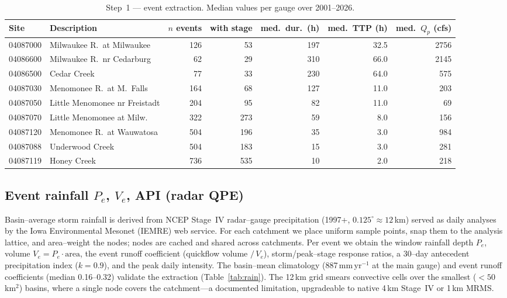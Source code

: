 \documentclass[11pt]{article}
\begin{document}
\begin{table}[htbp]\centering
\caption{Step~1 --- event extraction. Median values per gauge over 2001--2026.}
\label{tab:events}
\small
\begin{tabular}{llrrrrr}
\toprule
Site & Description & $n$ events & with stage & med.\ dur.\ (h) & med.\ TTP (h) & med.\ $Q_p$ (cfs) \\
\midrule
04087000 & Milwaukee R.\ at Milwaukee   & 126 & 53  & 197 & 32.5 & 2756 \\
04086600 & Milwaukee R.\ nr Cedarburg   & 62  & 29  & 310 & 66.0 & 2145 \\
04086500 & Cedar Creek                  & 77  & 33  & 230 & 64.0 & 575  \\
04087030 & Menomonee R.\ at M.\ Falls   & 164 & 68  & 127 & 11.0 & 203  \\
04087050 & Little Menomonee nr Freistadt& 204 & 95  & 82  & 11.0 & 69   \\
04087070 & Little Menomonee at Milw.    & 322 & 273 & 59  & 8.0  & 156  \\
04087120 & Menomonee R.\ at Wauwatosa   & 504 & 196 & 35  & 3.0  & 984  \\
04087088 & Underwood Creek              & 504 & 183 & 15  & 3.0  & 281  \\
04087119 & Honey Creek                  & 736 & 535 & 10  & 2.0  & 218  \\
\bottomrule
\end{tabular}
\end{table}

\subsection{Event rainfall $P_e$, $V_e$, API (radar QPE)}
Basin--average storm rainfall is derived from NCEP Stage~IV radar--gauge precipitation
(1997+, $0.125^{\circ}\approx12$\,km) served as daily analyses by the Iowa Environmental
Mesonet (IEMRE) web service. For each catchment we place uniform sample points, snap them to
the analysis lattice, and area--weight the nodes; nodes are cached and shared across
catchments. Per event we obtain the window rainfall depth $P_e$, volume $V_e=P_e\cdot\text{area}$,
the event runoff coefficient (quickflow volume $/\,V_e$), storm/peak--stage response ratios,
a 30--day antecedent precipitation index ($k=0.9$), and the peak daily intensity. The
basin--mean climatology (887\,mm\,yr$^{-1}$ at the main gauge) and event runoff coefficients
(median 0.16--0.32) validate the extraction (Table~\ref{tab:rain}). The 12\,km grid smears
convective cells over the smallest ($<50$\,km$^2$) basins, where a single node covers the
catchment---a documented limitation, upgradeable to native 4\,km Stage~IV or 1\,km MRMS.
\end{document}
